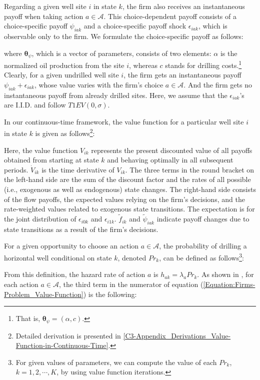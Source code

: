 Regarding a given well site $i$ in state $k$, the firm also receives an instantaneous payoff when taking action $a \in \mathcal{A}$. This choice-dependent payoff consists of a choice-specific payoff $\psi_{iak}$ and a choice-specific payoff shock $\epsilon_{iak}$, which is observable only to the firm. We formulate the choice-specific payoff as follows:

where $\boldsymbol{\theta}_{\psi}$, which is a vector of parameters, consists of two elements: $\alpha$ is the normalized oil production from the site $i$, whereas $c$ stands for drilling costs.\footnote{That is, $\boldsymbol{\theta}_{\psi} = (\alpha, c)$.} Clearly, for a given undrilled well site $i$, the firm gets an instantaneous payoff $\psi_{iak} + \epsilon_{iak}$, whose value varies with the firm's choice $a \in \mathcal{A}$. And the firm gets no instantaneous payoff from already drilled sites. Here, we assume that the $\epsilon_{iak}$'s are I.I.D. and follow $T1EV(0, \sigma)$. 

In our continuous-time framework, the value function for a particular well site $i$ in state $k$ is given as follows\footnote{Detailed derivation is presented in \ref{C3-Appendix_Derivations_Value-Function-in-Continuous-Time}.}:

Here, the value function $V_{ik}$ represents the present discounted value of all payoffs obtained from starting at state $k$ and behaving optimally in all subsequent periods. $\dot{V}_{ik}$ is the time derivative of $V_{ik}$. The three terms in the round bracket on the left-hand side are the sum of the discount factor and the rates of all possible (i.e., exogenous as well as endogenous) state changes. The right-hand side consists of the flow payoffs, the expected values relying on the firm's decisions, and the rate-weighted values related to exogenous state transitions. The expectation is for the joint distribution of $\epsilon_{i0k}$ and $\epsilon_{i1k}$. $\tilde{f}_{ik}$ and $\tilde{\psi}_{iak}$ indicate payoff changes due to state transitions as a result of the firm's decisions. 

For a given opportunity to choose an action $a \in \mathcal{A}$, the probability of drilling a horizontal well conditional on state $k$, denoted $Pr_{k}$, can be defined as follows\footnote{For given values of parameters, we can compute the value of each $Pr_{k}$, $k = 1, 2, \cdots, K$, by using value function iterations.}:

From this definition, the hazard rate of action $a$ is $h_{ak} = \lambda_{a} Pr_{k}$. 
As shown in \cite{Estimation-of-Dynamic-Discrete-Choice-Models-in-Continuous-Time_ABBE_2016}, for each action $a \in \mathcal{A}$, the third term in the numerator of equation (\ref{Equation:Firms-Problem_Value-Function}) is the following:


